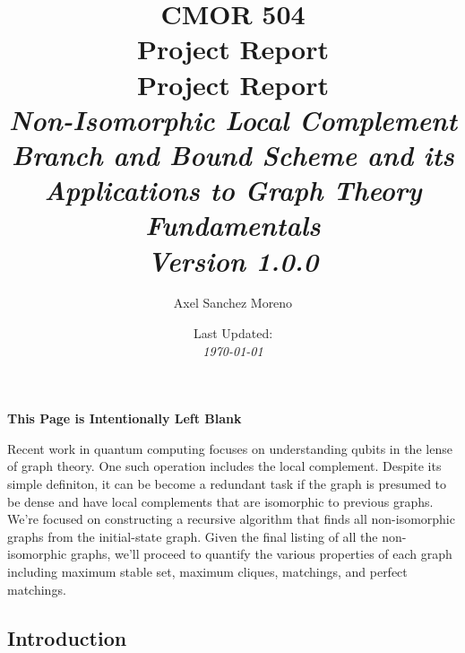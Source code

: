 \documentclass[12pt]{report} %
\title{
    \textbf{\Huge{CMOR 504 \\ Project Report}} \\ [0.5em] 
    \Large {\color{gray} 
        \textbf{Project Report} \\
        \emph{Non-Isomorphic Local Complement Branch and Bound Scheme and its Applications to Graph Theory Fundamentals}
    } \\[1em]
    \large{\textit{Version 1.0.0}}
}
\author{\LARGE{Axel Sanchez Moreno}}
\date{Last Updated: \\ \vspace{0.25em} \large{\textit{\today}}}
\begin{document}
\maketitle

\newpage

\thispagestyle{empty} %

\vspace*{\fill}
\begin{center}
    \Large \textbf{This Page is Intentionally Left Blank}
\end{center}
\vspace*{\fill}

\clearpage
{}
\setcounter{page}{1}

\newpage

\begin{tcolorbox}[colback=orange!10!white, colframe=orange!75!black, title=\center \Large \textbf{Abstract}]
    Recent work in quantum computing focuses on understanding qubits in the lense of graph theory. One such operation includes the local complement. Despite its simple definiton, it can be become a redundant task if the graph is presumed to be dense and have local complements 
    that are isomorphic to previous graphs. We're focused on constructing a recursive algorithm that finds all non-isomorphic graphs from the initial-state graph. Given the final listing of all the non-isomorphic graphs, we'll proceed to quantify the various properties of each 
    graph including maximum stable set, maximum cliques, matchings, and perfect matchings. 
\end{tcolorbox}

\subsection*{Introduction}

\end{document}
